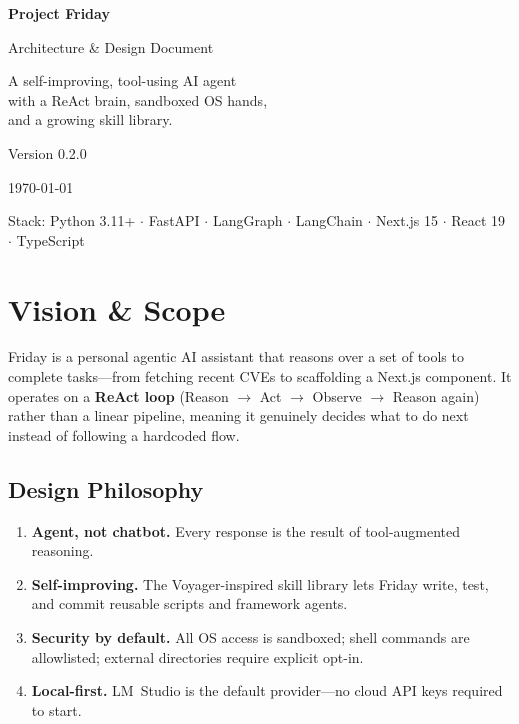 \documentclass[11pt,a4paper]{article}
\begin{document}
\begin{titlepage}
\centering
\vspace*{3cm}
{\Huge\bfseries\color{fridaybrand} Project Friday\par}
\vspace{0.6cm}
{\Large Architecture \& Design Document\par}
\vspace{1.5cm}
{\large A self-improving, tool-using AI agent\\with a ReAct brain, sandboxed OS hands,\\and a growing skill library.\par}
\vspace{2cm}
{\normalsize Version 0.2.0\par}
{\normalsize \today\par}
\vspace{1cm}
{\small Stack: Python 3.11+ $\cdot$ FastAPI $\cdot$ LangGraph $\cdot$ LangChain $\cdot$ Next.js 15 $\cdot$ React 19 $\cdot$ TypeScript\par}
\vfill
\end{titlepage}

\tableofcontents
\newpage

\section{Vision \& Scope}

Friday is a personal agentic AI assistant that reasons over a set of tools to complete tasks---from fetching recent CVEs to scaffolding a Next.js component.  It operates on a \textbf{ReAct loop} (Reason $\to$ Act $\to$ Observe $\to$ Reason again) rather than a linear pipeline, meaning it genuinely decides what to do next instead of following a hardcoded flow.

\subsection{Design Philosophy}

\begin{enumerate}[leftmargin=*]
  \item \textbf{Agent, not chatbot.}  Every response is the result of tool-augmented reasoning.
  \item \textbf{Self-improving.}  The Voyager-inspired skill library lets Friday write, test, and commit reusable scripts and framework agents.
  \item \textbf{Security by default.}  All OS access is sandboxed; shell commands are allow\-listed; external directories require explicit opt-in.
  \item \textbf{Local-first.}  LM~Studio is the default provider---no cloud API keys required to start.
\end{enumerate}
\end{document}
